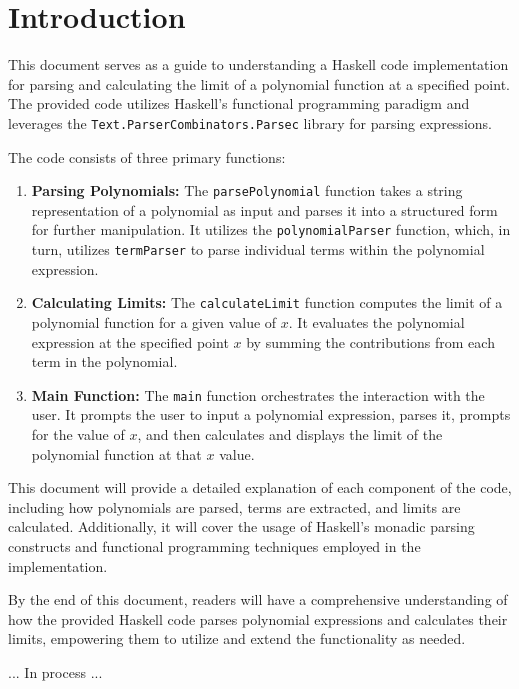 \documentclass{article}
\begin{document}
\section{Introduction}

This document serves as a guide to understanding a Haskell code implementation for parsing and calculating the limit of a polynomial function at a specified point. The provided code utilizes Haskell's functional programming paradigm and leverages the \texttt{Text.ParserCombinators.Parsec} library for parsing expressions.

The code consists of three primary functions:

\begin{enumerate}
  \item \textbf{Parsing Polynomials:} The \texttt{parsePolynomial} function takes a string representation of a polynomial as input and parses it into a structured form for further manipulation. It utilizes the \texttt{polynomialParser} function, which, in turn, utilizes \texttt{termParser} to parse individual terms within the polynomial expression.

  \item \textbf{Calculating Limits:} The \texttt{calculateLimit} function computes the limit of a polynomial function for a given value of $x$. It evaluates the polynomial expression at the specified point $x$ by summing the contributions from each term in the polynomial.

  \item \textbf{Main Function:} The \texttt{main} function orchestrates the interaction with the user. It prompts the user to input a polynomial expression, parses it, prompts for the value of $x$, and then calculates and displays the limit of the polynomial function at that $x$ value.
\end{enumerate}

This document will provide a detailed explanation of each component of the code, including how polynomials are parsed, terms are extracted, and limits are calculated. Additionally, it will cover the usage of Haskell's monadic parsing constructs and functional programming techniques employed in the implementation.

By the end of this document, readers will have a comprehensive understanding of how the provided Haskell code parses polynomial expressions and calculates their limits, empowering them to utilize and extend the functionality as needed.

... In process ...
\end{document}
